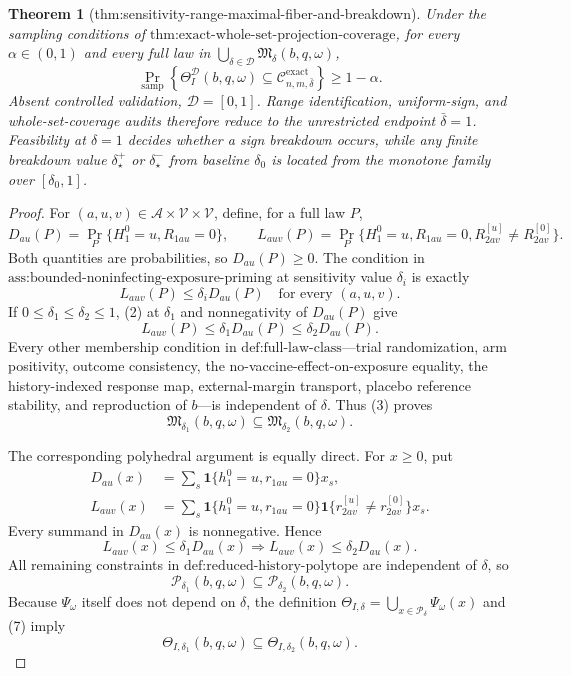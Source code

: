 \documentclass{article}
\newtheorem{theorem}{Theorem}
\begin{document}
\begin{theorem}[thm:sensitivity-range-maximal-fiber-and-breakdown]
Under the sampling conditions of \(\text{thm:exact-whole-set-projection-coverage}\), for every \(\alpha\in(0,1)\) and every full law in \(\bigcup_{\delta\in\mathcal D}\mathfrak M_\delta(b,q,\omega)\),
\[
 \Pr_{\mathrm{samp}}\!\left\{
 \Theta_I^{\mathcal D}(b,q,\omega)
 \subseteq\mathcal C_{n,m,\bar\delta}^{\mathrm{exact}}
 \right\}\geq1-\alpha.
\]
Absent controlled validation, \(\mathcal D=[0,1]\). Range identification, uniform-sign, and whole-set-coverage audits therefore reduce to the unrestricted endpoint \(\bar\delta=1\). Feasibility at \(\delta=1\) decides whether a sign breakdown occurs, while any finite breakdown value \(\delta_\star^+\) or \(\delta_\star^-\) from baseline \(\delta_0\) is located from the monotone family over \([\delta_0,1]\).
\end{theorem}
\begin{proof}
For \((a,u,v)\in\mathcal A\times\mathcal V\times\mathcal V\), define, for a full law \(P\),
\[
 D_{au}(P)=\Pr_P\{H_1^0=u,R_{1au}=0\},
 \qquad
 L_{auv}(P)=\Pr_P\{H_1^0=u,R_{1au}=0,
 R^{[u]}_{2av}\neq R^{[0]}_{2av}\}.
\tag{1}
\]
Both quantities are probabilities, so \(D_{au}(P)\geq0\).  The condition in \(\text{ass:bounded-noninfecting-exposure-priming}\) at sensitivity value \(\delta_i\) is exactly
\[
 L_{auv}(P)\leq\delta_iD_{au}(P)
 \quad\text{for every }(a,u,v).
\tag{2}
\]
If \(0\leq\delta_1\leq\delta_2\leq1\), (2) at \(\delta_1\) and nonnegativity of \(D_{au}(P)\) give
\[
 L_{auv}(P)
 \leq\delta_1D_{au}(P)
 \leq\delta_2D_{au}(P).
\tag{3}
\]
Every other membership condition in \(\text{def:full-law-class}\)—trial randomization, arm positivity, outcome consistency, the no-vaccine-effect-on-exposure equality, the history-indexed response map, external-margin transport, placebo reference stability, and reproduction of \(b\)—is independent of \(\delta\).  Thus (3) proves
\[
 \mathfrak M_{\delta_1}(b,q,\omega)
 \subseteq\mathfrak M_{\delta_2}(b,q,\omega).
\tag{4}
\]

The corresponding polyhedral argument is equally direct.  For \(x\geq0\), put
\[
 \begin{aligned}
 D_{au}(x)
 &=\sum_s\mathbf 1\{h_1^0=u,r_{1au}=0\}x_s,\\
 L_{auv}(x)
 &=\sum_s\mathbf 1\{h_1^0=u,r_{1au}=0\}
       \mathbf 1\{r^{[u]}_{2av}\neq r^{[0]}_{2av}\}x_s.
 \end{aligned}
\tag{5}
\]
Every summand in \(D_{au}(x)\) is nonnegative.  Hence
\[
 L_{auv}(x)\leq\delta_1D_{au}(x)
 \Longrightarrow
 L_{auv}(x)\leq\delta_2D_{au}(x).
\tag{6}
\]
All remaining constraints in \(\text{def:reduced-history-polytope}\) are independent of \(\delta\), so
\[
 \mathcal P_{\delta_1}(b,q,\omega)
 \subseteq\mathcal P_{\delta_2}(b,q,\omega).
\tag{7}
\]
Because \(\Psi_\omega\) itself does not depend on \(\delta\), the definition \(\Theta_{I,\delta}=\bigcup_{x\in\mathcal P_\delta}\Psi_\omega(x)\) and (7) imply
\[
 \Theta_{I,\delta_1}(b,q,\omega)
 \subseteq\Theta_{I,\delta_2}(b,q,\omega).
\tag{8}
\]


\end{proof}
\end{document}
